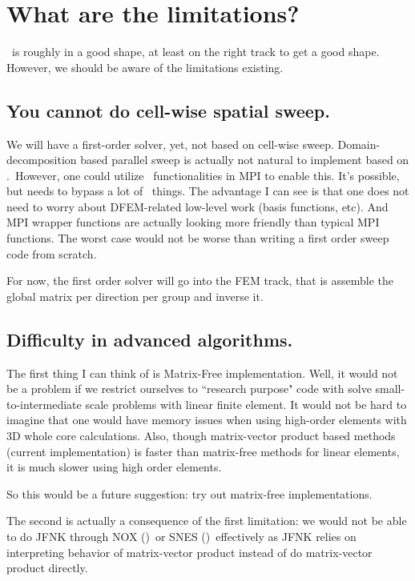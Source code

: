 \documentclass[letterpaper,11pt]{texMemo}
\begin{document}
\section{What are the limitations?}
{
	\xtrans\ is roughly in a good shape, at least on the right track to get a good shape. However, we should be aware of the limitations existing.
	
	\subsection{You cannot do cell-wise spatial sweep.}
	{
		We will have a first-order solver, yet, not based on cell-wise sweep. Domain-decomposition based parallel sweep is actually not natural to implement based on \deal.\ However, one could utilize \deal\ functionalities in MPI to enable this. It's possible, but needs to bypass a lot of \deal\ things. The advantage I can see is that one does not need to worry about DFEM-related low-level work (basis functions, etc). And MPI wrapper functions are actually looking more friendly than typical MPI functions. The worst case would not be worse than writing a first order sweep code from scratch.
		
		For now, the first order solver will go into the FEM track, that is assemble the global matrix per direction per group and inverse it.
	}
	
	\subsection{Difficulty in advanced algorithms.}
	{
		The first thing I can think of is Matrix-Free implementation. Well, it would not be a problem if we restrict ourselves to ``research purpose" code with solve small-to-intermediate scale problems with linear finite element. It would not be hard to imagine that one would have memory issues when using high-order elements with 3D whole core calculations. Also, though matrix-vector product based methods (current implementation) is faster than matrix-free methods for linear elements, it is much slower using high order elements.
		
		So this would be a future suggestion: try out matrix-free implementations.
		
		The second is actually a consequence of the first limitation: we would not be able to do JFNK through NOX (\trilinos)\ or SNES (\petsc)\ effectively as JFNK relies on interpreting behavior of matrix-vector product instead of do matrix-vector product directly.
	}
}
\end{document}

